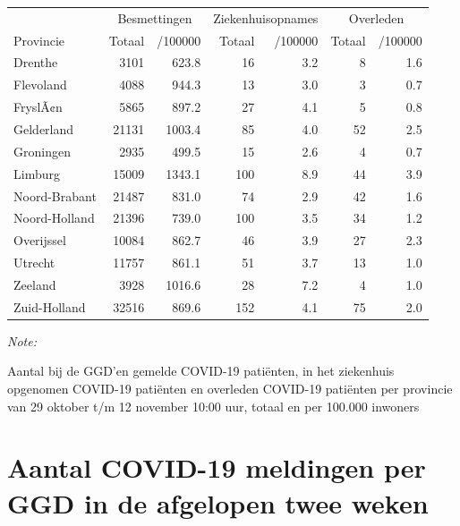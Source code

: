 \documentclass[
  english,
  man,floatsintext]{apa6}
\begin{document}
\begin{table}
\centering
\begin{threeparttable}
\begin{tabular}{lrrrrrr}
\toprule
\multicolumn{1}{c}{ } & \multicolumn{2}{c}{Besmettingen} & \multicolumn{2}{c}{Ziekenhuisopnames} & \multicolumn{2}{c}{Overleden} \\
\cmidrule(l{3pt}r{3pt}){2-3} \cmidrule(l{3pt}r{3pt}){4-5} \cmidrule(l{3pt}r{3pt}){6-7}
Provincie & Totaal & /100000 & Totaal & /100000 & Totaal & /100000\\
\midrule
Drenthe & 3101 & 623.8 & 16 & 3.2 & 8 & 1.6\\
Flevoland & 4088 & 944.3 & 13 & 3.0 & 3 & 0.7\\
FryslÃ¢n & 5865 & 897.2 & 27 & 4.1 & 5 & 0.8\\
Gelderland & 21131 & 1003.4 & 85 & 4.0 & 52 & 2.5\\
Groningen & 2935 & 499.5 & 15 & 2.6 & 4 & 0.7\\
Limburg & 15009 & 1343.1 & 100 & 8.9 & 44 & 3.9\\
Noord-Brabant & 21487 & 831.0 & 74 & 2.9 & 42 & 1.6\\
Noord-Holland & 21396 & 739.0 & 100 & 3.5 & 34 & 1.2\\
Overijssel & 10084 & 862.7 & 46 & 3.9 & 27 & 2.3\\
Utrecht & 11757 & 861.1 & 51 & 3.7 & 13 & 1.0\\
Zeeland & 3928 & 1016.6 & 28 & 7.2 & 4 & 1.0\\
Zuid-Holland & 32516 & 869.6 & 152 & 4.1 & 75 & 2.0\\
\bottomrule
\end{tabular}
\begin{tablenotes}
\item \textit{Note: } 
\item Aantal bij de GGD’en gemelde COVID-19 patiënten, in het ziekenhuis opgenomen COVID-19 patiënten en overleden COVID-19 patiënten per provincie van 29 oktober t/m 12 november 10:00 uur, totaal en per 100.000 inwoners
\end{tablenotes}
\end{threeparttable}
\end{table}

\newpage

\hypertarget{aantal-covid-19-meldingen-per-ggd-in-de-afgelopen-twee-weken}{%
\section{Aantal COVID-19 meldingen per GGD in de afgelopen twee weken}\label{aantal-covid-19-meldingen-per-ggd-in-de-afgelopen-twee-weken}}
\end{document}
